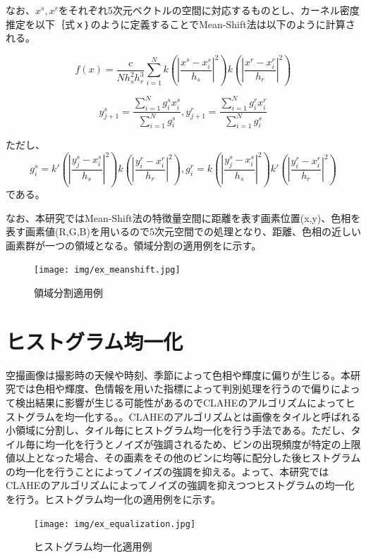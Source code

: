 \documentclass[../Thesis]{subfiles}
\begin{document}
  なお、$x^s,x^r$をそれぞれ5次元ベクトルの空間に対応するものとし、カーネル密度推定を以下｛式ｘ｝のように定義することでMean-Shift法は以下のように計算される。

  \begin{equation}
    f(x) = \frac{c}{Nh_s^2h_r^3} \sum_{i=1}^N k (|\frac{x^s-x_i^s}{h_s}|^2) k (|\frac{x^r-x_i^r}{h_r}|^2)
  \end{equation}

  \begin{equation}
    y_{j+1}^s = \frac{\sum_{i=1}^N g_i^sx_i^s}{\sum_{i=1}^N g_i^s}, y_{j+1}^r = \frac{\sum_{i=1}^N g_i^rx_i^r}{\sum_{i=1}^N g_i^s}
  \end{equation}

  ただし、
  \begin{equation}
    g_i^s = k' (|\frac{y_j^s-x_i^s}{h_s}|^2) k (|\frac{y_i^r-x_i^r}{h_r}|^2), g_i^r = k (|\frac{y_j^s-x_i^s}{h_s}|^2) k' (|\frac{y_i^r-x_i^r}{h_r}|^2)
  \end{equation}
  である。
  
  なお、本研究ではMean-Shift法の特徴量空間に距離を表す画素位置(x,y)、色相を表す画素値(R,G,B)を用いるので5次元空間での処理となり、距離、色相の近しい画素群が一つの領域となる。領域分割の適用例をに示す。

  \begin{figure}[h]
		\centering
		\texttt{[image: img/ex\_meanshift.jpg]}
		\caption{領域分割適用例}
		\label{img02}
  \end{figure}


\section{ヒストグラム均一化}
  空撮画像は撮影時の天候や時刻、季節によって色相や輝度に偏りが生じる。本研究では色相や輝度、色情報を用いた指標によって判別処理を行うので偏りによって検出結果に影響が生じる可能性があるのでCLAHEのアルゴリズムによってヒストグラムを均一化する。\cite{art05}。CLAHEのアルゴリズムとは画像をタイルと呼ばれる小領域に分割し、タイル毎にヒストグラム均一化を行う手法である。ただし、タイル毎に均一化を行うとノイズが強調されるため、ビンの出現頻度が特定の上限値以上となった場合、その画素をその他のビンに均等に配分した後ヒストグラムの均一化を行うことによってノイズの強調を抑える。よって、本研究ではCLAHEのアルゴリズムによってノイズの強調を抑えつつヒストグラムの均一化を行う。ヒストグラム均一化の適用例をに示す。

	\begin{figure}[h]
		\centering
		\texttt{[image: img/ex\_equalization.jpg]}
		\caption{ヒストグラム均一化適用例}
		\label{img03}
  \end{figure}
\end{document}
